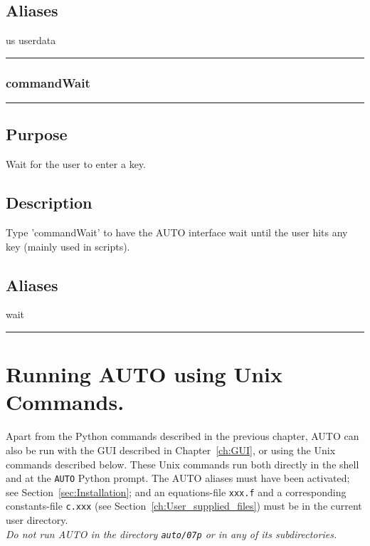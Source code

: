 \documentclass[12pt]{report}
\begin{document}
\begin{minipage}{6in}
    \section*{Aliases}
us userdata \medskip\hrule\end{minipage}\subsection{commandWait} \label{sec:clui_ref_commandWait}\begin{minipage}{6in}\hrule\medskip\section*{Purpose}
Wait for the user to enter a key.\section*{Description}

    Type 'commandWait' to have the AUTO interface wait
    until the user hits any key (mainly used in scripts).
    \section*{Aliases}
wait \medskip\hrule\end{minipage}

\chapter{ Running {\cal AUTO} using Unix Commands.} \label{sec:command_mode}
Apart from the Python commands described in the previous chapter,
{\cal AUTO} can also be run with the GUI described in Chapter~\ref{ch:GUI},
or using the Unix commands described below. These Unix commands run both
directly in the shell and at the {\tt AUTO} Python prompt.
The {\cal AUTO} aliases must have been activated; see Section~\ref{sec:Installation}; 
and an equations-file {\tt xxx.f} 
and a corresponding constants-file {\tt c.xxx} 
(see Section~\ref{ch:User_supplied_files})
must be in the current user directory.
\\
{\it Do not run {\cal AUTO} in the directory {\tt auto/07p} 
or in any of its subdirectories.}
\end{document}

